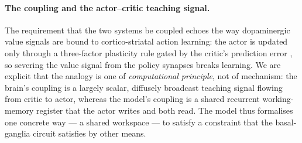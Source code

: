 \paragraph{The coupling and the actor--critic teaching signal.}
The requirement that the two systems be coupled echoes the way dopaminergic value
signals are bound to cortico-striatal action learning: the actor is updated only
through a three-factor plasticity rule gated by the critic's prediction error
\citep{schultz1997neural, reynolds2002dopamine, kusmierz2017learning,
morita2014striatal}, so severing the value signal from the policy synapses breaks
learning. We are explicit that the analogy is one of \emph{computational principle},
not of mechanism: the brain's coupling is a largely scalar, diffusely broadcast
teaching signal flowing from critic to actor, whereas the model's coupling is a shared
recurrent working-memory register that the actor writes and both read. The model thus
formalises one concrete way --- a shared workspace --- to satisfy a constraint that the
basal-ganglia circuit satisfies by other means.

